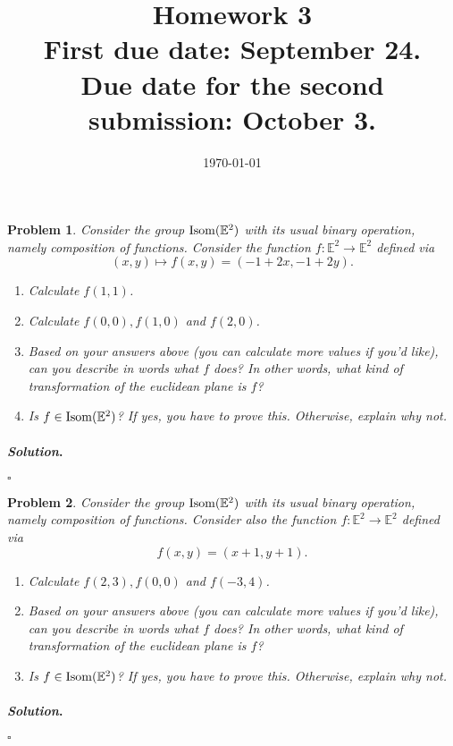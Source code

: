 \documentclass[reqno]{amsart}
\theoremstyle{plain}
\newtheorem{problem}{Problem}
\theoremstyle{definition}
\newenvironment{solution}{\paragraph{\emph{Solution}.}}{\hfill$\square$}
\begin{document}
 

\title[Homework 3]{Homework 3 \\ First due date: September 24.  \\  Due date for the second submission:  October 3.}

\date{\today} 
\maketitle 


\begin{problem}
Consider the group ${\rm Isom}(\mathbb{E}^{2})$ with its usual binary operation, namely composition of functions.  Consider the function $f:\mathbb{E}^{2} \longrightarrow \mathbb{E}^{2}$ defined via
$$(x,y) \mapsto f(x,y) = (-1+2x,-1 + 2y). $$
\begin{enumerate}
\item Calculate $f(1,1)$.
\item Calculate $f(0,0),f(1,0)$ and $f(2,0)$.  
\item Based on your answers above (you can calculate more values if you'd like), can you describe in words what $f$ does?  In other words, what kind of transformation of the euclidean plane is $f$?
\item Is $f \in {\rm Isom}(\mathbb{E}^{2})$?  If yes, you have to prove this.  Otherwise, explain why not.
\end{enumerate}
\end{problem}
\begin{solution}

\end{solution}

\begin{problem}
Consider the group ${\rm Isom}(\mathbb{E}^{2})$ with its usual binary operation, namely composition of functions.  Consider also the function $f:\mathbb{E}^{2} \longrightarrow \mathbb{E}^{2}$ defined via 
$$f(x,y) = (x+1,y+1). $$
\begin{enumerate}
\item Calculate $f(2,3), f(0,0)$ and $f(-3,4)$.
\item Based on your answers above (you can calculate more values if you'd like), can you describe in words what $f$ does?  In other words, what kind of transformation of the euclidean plane is $f$?
\item Is $f \in {\rm Isom}(\mathbb{E}^{2})$?  If yes, you have to prove this.  Otherwise, explain why not.
\end{enumerate}
\end{problem}
\begin{solution}

\end{solution}
\end{document}
